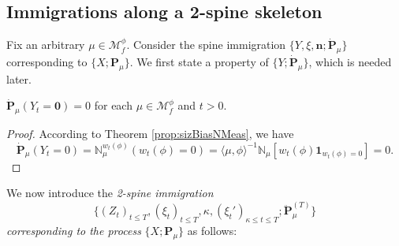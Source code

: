\subsection{Immigrations along a 2-spine skeleton}
\label{size-biased-equation}
	Fix an arbitrary $\mu \in \mathcal M_f^\phi$.
	Consider the spine immigration $\{Y, \xi, \mathbf n; \dot{\mathbf P}_\mu\}$ corresponding to $\{X; \mathbf P_\mu\}$.
	We first state a property of $\{Y; \dot{\mathbf P}_\mu\}$, which is needed later.
\begin{lem}\label{lem:Y-is-immortal}
	$\dot{\mathbf P}_\mu(Y_t = \mathbf 0) = 0$ for each $\mu \in \mathcal M_f^\phi$ and $t>0$.
\end{lem}
\begin{proof}
	According to Theorem \ref{prop:sizBiasNMeas}, we have
\[
	\dot{\mathbf P}_\mu (Y_t = 0)
	= \mathbb N^{w_t(\phi)}_\mu ( w_t(\phi) = 0 )
	= \langle \mu, \phi \rangle^{-1} \mathbb N_\mu [ w_t(\phi) \mathbf 1_{w_t(\phi) = 0}]
	= 0.
\]
\end{proof}
\par
	We now introduce the \emph{2-spine immigration}
\[
	\{(Z_t)_{t\leq T}, (\xi_t)_{t\leq T}, \kappa, (\xi_t')_{\kappa\leq t\leq T}; \ddot {\mathbf P}_\mu^{(T)}\}
\]
	\emph{corresponding to the process} $\{X; \mathbf P_\mu\}$  as follows:
